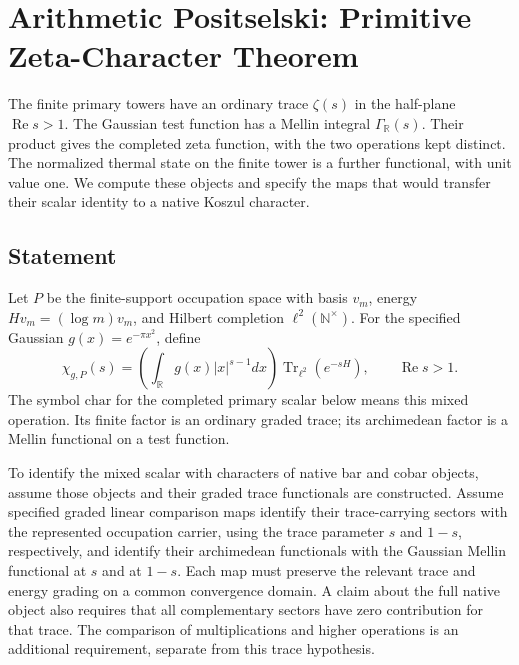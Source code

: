\chapter{Arithmetic Positselski: Primitive Zeta-Character Theorem}
\label{v4-arith:prim-zeta-char}

The finite primary towers have an ordinary trace \(\zeta(s)\) in the
half-plane \(\operatorname{Re}s>1\). The Gaussian test function has a
Mellin integral \(\Gamma_{\mathbb R}(s)\). Their product gives the
completed zeta function, with the two operations kept distinct. The
normalized thermal state on the finite tower is a further functional,
with unit value one. We compute these objects and specify the maps
that would transfer their scalar identity to a native Koszul character.

\section{Statement}
\label{v4-arith:prim-zeta:statement}

\begin{definition}
\label{v4-arith:prim-zeta:mixed-character}
Let \(P\) be the finite-support occupation space with basis \(v_m\),
energy \(Hv_m=(\log m)v_m\), and Hilbert completion \(\ell^2(\mathbb N^\times)\).
For the specified Gaussian \(g(x)=e^{-\pi x^2}\), define
\[
 \chi_{g,P}(s)=\left(\int_{\mathbb R}g(x)|x|^{s-1}dx\right)
                    \operatorname{Tr}_{\ell^2}(e^{-sH}),
                    \qquad\operatorname{Re}s>1.
\]
The symbol \(\mathrm{char}\) for the completed primary scalar below
means this mixed operation. Its finite factor is an ordinary graded
trace; its archimedean factor is a Mellin functional on a test function.
\end{definition}

\begin{hypothesis}
\label{v4-arith:prim-zeta:native-character-hypothesis}
To identify the mixed scalar with characters of native bar and cobar
objects, assume those objects and their graded trace functionals are
constructed. Assume specified graded linear comparison maps identify
their trace-carrying sectors with the represented occupation carrier,
using the trace parameter \(s\) and \(1-s\), respectively, and identify their archimedean
functionals with the Gaussian Mellin functional at \(s\) and at
\(1-s\). Each map must preserve the relevant trace and energy grading
on a common convergence domain. A claim about the full native object
also requires that all complementary sectors have zero contribution
for that trace. The comparison of multiplications and higher operations
is an additional requirement, separate from this trace hypothesis.
\end{hypothesis}

